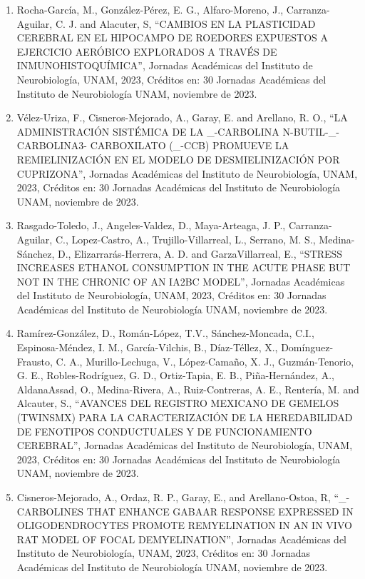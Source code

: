 \begin{enumerate}
\item  Rocha-García, M., González-Pérez, E. G., Alfaro-Moreno, J., Carranza-Aguilar, C. J. and Alacuter, S, “CAMBIOS EN LA 
PLASTICIDAD CEREBRAL EN EL HIPOCAMPO DE ROEDORES EXPUESTOS A EJERCICIO AERÓBICO EXPLORADOS A TRAVÉS DE INMUNOHISTOQUÍMICA”, 
Jornadas Académicas del Instituto de Neurobiología, UNAM, 2023, Créditos en: 30 Jornadas Académicas del Instituto de 
Neurobiología UNAM, noviembre de 2023.

\item  Vélez-Uriza, F., Cisneros-Mejorado, A., Garay, E. and Arellano, R. O., “LA ADMINISTRACIÓN SISTÉMICA DE LA _-CARBOLINA 
N-BUTIL-_-CARBOLINA3- CARBOXILATO (_-CCB) PROMUEVE LA REMIELINIZACIÓN EN EL MODELO DE DESMIELINIZACIÓN POR CUPRIZONA”, 
Jornadas Académicas del Instituto de Neurobiología, UNAM, 2023, Créditos en: 30 Jornadas Académicas del
Instituto de Neurobiología UNAM, noviembre de 2023.

\item  Rasgado-Toledo, J., Angeles-Valdez, D., Maya-Arteaga, J. P., Carranza-Aguilar, C., Lopez-Castro, A., 
Trujillo-Villarreal, 
L., Serrano, M. S., Medina-Sánchez, D., Elizarrarás-Herrera, A. D. and GarzaVillarreal, E., “STRESS INCREASES ETHANOL 
CONSUMPTION IN THE ACUTE PHASE BUT NOT IN THE CHRONIC OF AN IA2BC MODEL”, Jornadas Académicas del Instituto de Neurobiología, 
UNAM, 2023, Créditos en: 30 Jornadas Académicas del Instituto de Neurobiología UNAM, noviembre de 2023.

\item  Ramírez-González, D., Román-López, T.V., Sánchez-Moncada, C.I., Espinosa-Méndez, I. M., García-Vilchis, B., 
Díaz-Téllez, 
X., Domínguez-Frausto, C. A., Murillo-Lechuga, V., López-Camaño, X. J., Guzmán-Tenorio, G. E., Robles-Rodríguez, G. D., 
Ortiz-Tapia, E. B., Piña-Hernández, A., AldanaAssad, O., Medina-Rivera, A., Ruiz-Contreras, A. E., Rentería, M. and Alcauter, 
S., “AVANCES DEL REGISTRO MEXICANO DE GEMELOS (TWINSMX) PARA LA CARACTERIZACIÓN DE LA HEREDABILIDAD DE FENOTIPOS CONDUCTUALES 
Y DE FUNCIONAMIENTO CEREBRAL”, Jornadas Académicas del Instituto de Neurobiología, UNAM, 2023, Créditos en: 30 Jornadas 
Académicas del Instituto de Neurobiología UNAM, noviembre de 2023.

\item  Cisneros-Mejorado, A., Ordaz, R. P., Garay, E., and Arellano-Ostoa, R, “_-CARBOLINES THAT ENHANCE GABAAR RESPONSE 
EXPRESSED IN OLIGODENDROCYTES PROMOTE REMYELINATION IN AN IN VIVO RAT MODEL OF FOCAL DEMYELINATION”, Jornadas Académicas del 
Instituto de Neurobiología, UNAM, 2023, Créditos en: 30 Jornadas Académicas del Instituto de Neurobiología UNAM, noviembre de 
2023.


\end{enumerate}
